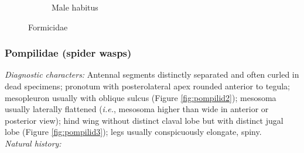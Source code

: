 \documentclass[letterpaper, 11pt]{article}
\begin{document}
\begin{figure}[ht!]
\begin{subfigure}[ht!]{0.35\textwidth}
        \caption{Male habitus \citep[][Fig. 92]{goulet1993hymenoptera}}
        \label{fig:formicid2}
    \end{subfigure}
    \caption{Formicidae}\label{fig:formicids}
\end{figure}

\subsubsection{Pompilidae (spider wasps)}
\noindent{}\textit{Diagnostic characters:} Antennal segments distinctly separated and often curled in dead specimens; pronotum with posterolateral apex rounded anterior to tegula; mesopleuron usually with oblique sulcus (Figure \ref{fig:pompilid2}); mesosoma usually laterally flattened (\textit{i.e.}, mesosoma higher than wide in anterior or posterior view); hind wing without distinct claval lobe but with distinct jugal lobe (Figure \ref{fig:pompilid3}); legs usually conspicuously elongate, spiny.\\

\noindent{}\textit{Natural history:} \\
\end{document}
